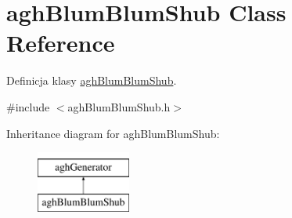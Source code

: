 \hypertarget{classaghBlumBlumShub}{\section{agh\-Blum\-Blum\-Shub \-Class \-Reference}
\label{classaghBlumBlumShub}
}


\-Definicja klasy \hyperlink{classaghBlumBlumShub}{agh\-Blum\-Blum\-Shub}.  




{\ttfamily \#include $<$agh\-Blum\-Blum\-Shub.\-h$>$}

\-Inheritance diagram for agh\-Blum\-Blum\-Shub\-:\begin{figure}[H]
\begin{center}
\leavevmode
\includegraphics[height=2.000000cm]{classaghBlumBlumShub}
\end{center}
\end{figure}
